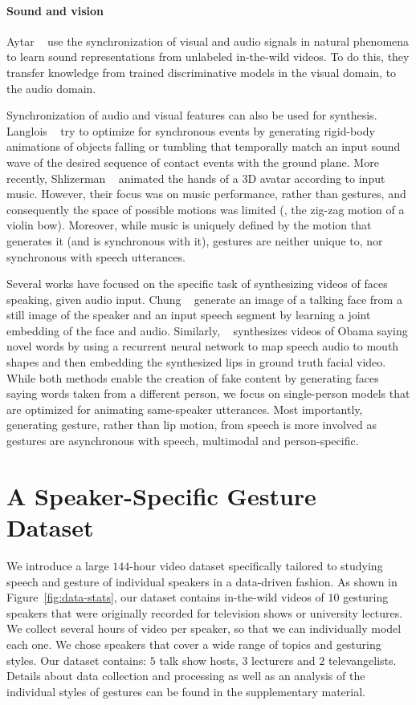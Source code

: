 \documentclass[10pt,twocolumn,letterpaper]{article}
\newcommand{\mypar}[1]{\vspace{-2mm}\paragraph{#1}}
\newcommand{\fig}[1]{Figure~\ref{#1}}
\begin{document}
\mypar{Sound and vision}
Aytar \etal~\cite{aytar2016soundnet} use the synchronization of visual and audio signals in natural phenomena to  learn sound representations from unlabeled in-the-wild videos. To do this, they transfer knowledge from trained discriminative models in the visual domain, to the audio domain. 

Synchronization of audio and visual features can also be used for synthesis. Langlois \etal~\cite{Langlois2014} try to optimize for synchronous events by generating rigid-body animations of objects falling or tumbling that temporally match an input sound wave of the desired sequence of contact events with the ground plane. More recently, Shlizerman \etal~\cite{shlizermanaudio} animated the hands of a 3D avatar according to input music. However, their focus was on music performance, rather than gestures, and consequently the space of possible motions was limited (\eg, the zig-zag motion of a violin bow). Moreover, while music is uniquely defined by the motion that generates it (and is synchronous with it), gestures are neither unique to, nor synchronous with speech utterances.

Several works have focused on the specific task of synthesizing videos of faces speaking, given audio input.
Chung \etal~\cite{Chung17b} generate an image of a talking face from a still image of the speaker and an input speech segment by learning a joint embedding of the face and audio. Similarly, ~\cite{Obama2017} synthesizes videos of Obama saying novel words by using a recurrent neural network to map speech audio to mouth shapes and then embedding the synthesized lips in ground truth facial video. While both methods enable the creation of fake content by generating faces saying words taken from a different person, we focus on single-person models that are optimized for animating same-speaker utterances. Most
importantly, generating gesture, rather than lip motion, from speech is more involved as gestures are asynchronous with speech, multimodal and person-specific.

\section{A Speaker-Specific Gesture Dataset}

\label{sec:data}
\newcommand{\dsetname}{Gestures\xspace}

We introduce a large $144$-hour video dataset specifically tailored to studying speech and gesture of individual speakers in a data-driven fashion. As shown in \fig{fig:data-stats}, our dataset contains in-the-wild videos of $10$ gesturing speakers that were originally recorded for television shows or university lectures. We collect several hours of video per speaker, so that we can individually model each one. We chose speakers that cover a wide range of topics and gesturing styles. Our dataset contains: $5$ talk show hosts, $3$ lecturers and $2$ televangelists. Details about data collection and processing as well as an analysis of the individual styles of gestures can be found in the supplementary material.
\end{document}
